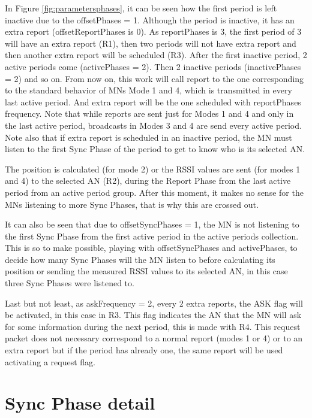In Figure \ref{fig:parametersphases}, it can be seen how the first period is left inactive due to the offsetPhases = 1. Although the period
is inactive, it has an extra report (offsetReportPhases is 0). As reportPhases is 3, the first period of 3 will have an extra report (R1), 
then two periods will not have extra report and then another extra report will be scheduled (R3). After the first inactive period, 2 active 
periods come (activePhases = 2). Then 2 inactive periods (inactivePhases = 2) and so on. From now on, this work will call report to the one 
corresponding to the standard behavior of \acp{MN} Mode 1 and 4, which is transmitted in every last active period. And extra report will be 
the one scheduled with reportPhases frequency. Note that while reports are sent just for Modes 1 and 4 and only in the last active period,
broadcasts in Modes 3 and 4 are send every active period. Note also that if extra report is scheduled in an inactive period, the \ac{MN} must
listen to the first Sync Phase of the period to get to know who is its selected \ac{AN}.

The position is calculated (for mode 2) or the \ac{RSSI} values are sent (for modes 1 and 4) to the selected \ac{AN} (R2), during the Report Phase from 
the last active period from an active period group. After this moment, it makes no sense for the \acp{MN} listening to more
Sync Phases, that is why this are crossed out. 

It can also be seen that due to offsetSyncPhases = 1, the \ac{MN} is not listening to the first Sync Phase from the first active period in the active
periods collection. This is so to make possible, playing with offsetSyncPhases and activePhases, to decide how many Sync Phases will the \ac{MN}
listen to before calculating its position or sending the measured \ac{RSSI} values to its selected \ac{AN}, in this case three Sync Phases were listened to.

Last but not least, as askFrequency = 2, every 2 extra reports, the ASK flag will be activated, in this case in R3. This flag indicates the 
\ac{AN} that the \ac{MN} will ask for some information during the next period, this is made with R4. This request packet does not necessary correspond
to a normal report (modes 1 or 4) or to an extra report but if the period has already one, the same report will be used activating a request
flag.


\section{Sync Phase detail}

